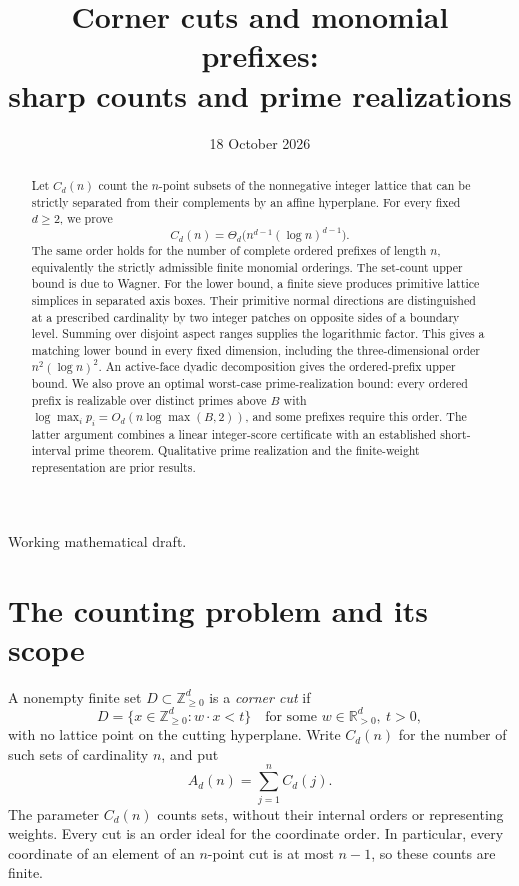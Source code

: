 \documentclass[11pt,a4paper]{article}
\title{Corner cuts and monomial prefixes:\\sharp counts and prime realizations}
\author{}
\date{18 October 2026}
\theoremstyle{remark}
\newcommand{\Z}{\mathbb Z}
\newcommand{\R}{\mathbb R}
\newcommand{\Nzero}{\Z_{\geq0}}
\begin{document}
\maketitle
\begin{center}
\small Working mathematical draft.
\end{center}

\begin{abstract}
Let \(C_d(n)\) count the \(n\)-point subsets of the nonnegative integer
lattice that can be strictly separated from their complements by an affine
hyperplane. For every fixed \(d\geq2\), we prove
\[
 C_d(n)=\Theta_d\!\bigl(n^{d-1}(\log n)^{d-1}\bigr).
\]
The same order holds for the number of complete ordered prefixes of
length \(n\), equivalently the strictly admissible finite monomial
orderings. The set-count upper bound is due to Wagner. For the lower
bound, a finite
sieve produces primitive lattice simplices in separated axis boxes.
Their primitive normal directions are distinguished at a prescribed
cardinality by two integer patches on opposite sides of a boundary
level. Summing over disjoint aspect ranges supplies the logarithmic
factor. This gives a matching lower bound in every fixed dimension,
including the three-dimensional order \(n^2(\log n)^2\).
An active-face dyadic decomposition gives the ordered-prefix upper bound.
We also prove an optimal worst-case prime-realization bound: every
ordered prefix is realizable over distinct primes above \(B\) with
\(\log\max_i p_i=O_d(n\log\max(B,2))\), and some prefixes require
this order. The latter argument combines a linear integer-score
certificate with an established short-interval prime theorem. Qualitative
prime realization and the finite-weight representation are prior results.
\end{abstract}

\section{The counting problem and its scope}
A nonempty finite set \(D\subset\Nzero^d\) is a \emph{corner cut} if
\[
 D=\{x\in\Nzero^d:w\cdot x<t\}
 \quad\text{for some }w\in\R_{>0}^d,\ t>0,
\]
with no lattice point on the cutting hyperplane. Write \(C_d(n)\) for the
number of such sets of cardinality \(n\), and put
\[
 A_d(n)=\sum_{j=1}^{n}C_d(j).
\]
The parameter \(C_d(n)\) counts sets, without their internal orders or
representing weights. Every cut is an order ideal for the coordinate order.
In particular, every coordinate of an element of an \(n\)-point cut
is at most \(n-1\), so these counts are finite.
\end{document}
